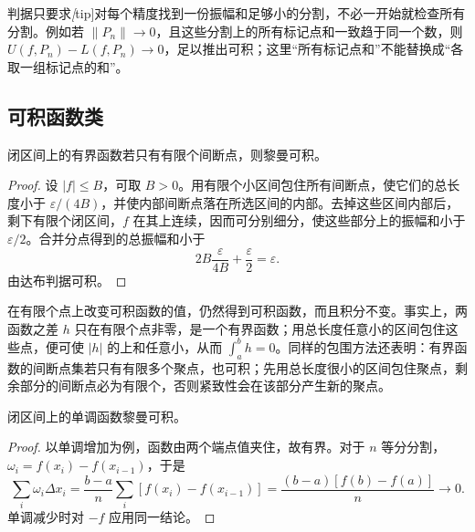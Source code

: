 判据只要求\emph[tip]{对每个精度找到一份振幅和足够小的分割}，不必一开始就检查所有分割。例如若 $\|P_n\|\to0$，且这些分割上的所有标记点和一致趋于同一个数，则 $U(f,P_n)-L(f,P_n)\to0$，足以推出可积；这里“所有标记点和”不能替换成“各取一组标记点的和”。

\subsection{可积函数类}
\label{subsec:classes-of-integrable-functions}

\begin{theorem}
\label{thm:finite-discontinuities-integrable}
闭区间上的有界函数若只有有限个间断点，则黎曼可积。
\end{theorem}
\begin{proof}
设 $|f|\leq B$，可取 $B>0$。用有限个小区间包住所有间断点，使它们的总长度小于 $\varepsilon/(4B)$，并使内部间断点落在所选区间的内部。去掉这些区间内部后，剩下有限个闭区间，$f$ 在其上连续，因而可分别细分，使这些部分上的振幅和小于 $\varepsilon/2$。合并分点得到的总振幅和小于
\[
    2B\frac{\varepsilon}{4B}+\frac{\varepsilon}{2}=\varepsilon.
\]
由达布判据可积。
\end{proof}

在有限个点上改变可积函数的值，仍然得到可积函数，而且积分不变。事实上，两函数之差 $h$ 只在有限个点非零，是一个有界函数；用总长度任意小的区间包住这些点，便可使 $|h|$ 的上和任意小，从而 $\int_a^b h=0$。同样的包围方法还表明：有界函数的间断点集若只有有限多个聚点，也可积；先用总长度很小的区间包住聚点，剩余部分的间断点必为有限个，否则紧致性会在该部分产生新的聚点。

\begin{theorem}
\label{thm:monotone-functions-riemann-integrable}
闭区间上的单调函数黎曼可积。
\end{theorem}
\begin{proof}
以单调增加为例，函数由两个端点值夹住，故有界。对于 $n$ 等分分割，$\omega_i=f(x_i)-f(x_{i-1})$，于是
\[
    \sum_i\omega_i\Delta x_i
    =\frac{b-a}{n}\sum_i[f(x_i)-f(x_{i-1})]
    =\frac{(b-a)[f(b)-f(a)]}{n}\longrightarrow0.
\]
单调减少时对 $-f$ 应用同一结论。
\end{proof}

